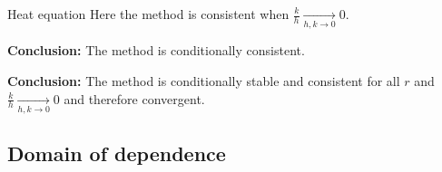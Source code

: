 \begin{example}{Heat equation}{}
  Here the method is consistent when \(\frac{k}{h} \underset{h,k \to 0}{\longrightarrow} 0\).

  \textbf{Conclusion:} The method is conditionally consistent.

  \textbf{Conclusion:} The method is conditionally stable and consistent for all \( r \) and \( \frac{k}{h} \underset{h,k \to 0}{\longrightarrow} 0 \) and therefore convergent.

\end{example}

\subsection*{Domain of dependence}





